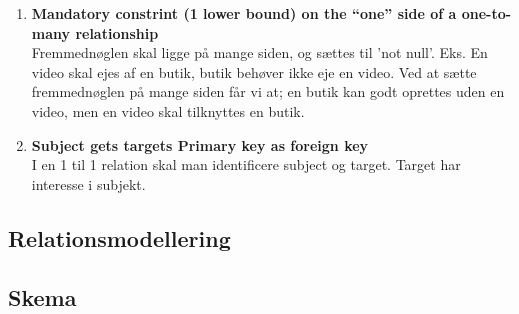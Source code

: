 \begin{enumerate}
	\item \textbf{Mandatory constrint (1 lower bound) on the “one” side of a one-to-many relationship}\\
	Fremmednøglen skal ligge på mange siden, og sættes til ’not null’. Eks. En video skal ejes af en
	butik, butik behøver ikke eje en video. Ved at sætte fremmednøglen på mange siden får vi at; en
	butik kan godt oprettes uden en video, men en video skal tilknyttes en butik.
	
	\item \textbf{Subject gets targets Primary key as foreign key}\\
	I en 1 til 1 relation skal man identificere subject og target. Target har interesse i subjekt.
	
\end{enumerate}

\subsection{Relationsmodellering}

\subsection{Skema}